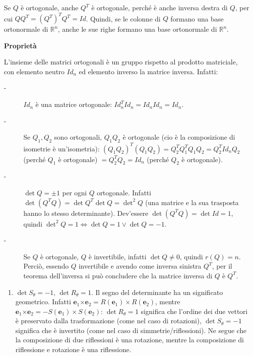 \documentclass{article}
\begin{document}
Se $Q$ \`{e} ortogonale, anche $Q^{T}$ \`{e} ortogonale, perch\'{e} \`{e}
anche inversa destra di $Q$, per cui $QQ^{T}=\left( Q^{T}\right)
^{T}Q^{T}=Id $. Quindi, se le colonne di $Q$ formano una base ortonormale di 
$%
\mathbb{R}
^{n}$, anche le sue righe formano una base ortonormale di $%
\mathbb{R}
^{n}$.

\textbf{Propriet\`{a}}

L'insieme delle matrici ortogonali \`{e} un gruppo rispetto al prodotto
matriciale, con elemento neutro $Id_{n}$ ed elemento inverso la matrice
inversa. Infatti:

\begin{description}
\item[-] $Id_{n}$ \`{e} una matrice ortogonale: $%
Id_{n}^{T}Id_{n}=Id_{n}Id_{n}=Id_{n}$.

\item[-] Se $Q_{1},Q_{2}$ sono ortogonali, $Q_{1}Q_{2}$ \`{e} ortogonale (cio%
\`{e} la composizione di isometrie \`{e} un'isometria): $\left(
Q_{1}Q_{2}\right) ^{T}\left( Q_{1}Q_{2}\right)
=Q_{2}^{T}Q_{1}^{T}Q_{1}Q_{2}=Q_{2}^{T}Id_{n}Q_{2}$ (perch\'{e} $Q_{1}$ \`{e}
ortogonale) $=Q_{2}^{T}Q_{2}=Id_{n}$ (perch\'{e} $Q_{2}$ \`{e} ortogonale).

\item[-] $\det Q=\pm 1$ per ogni $Q$ ortogonale. Infatti $\det \left(
Q^{T}Q\right) =\det Q^{T}\det Q=\det^{2}Q$ (una matrice e la sua trasposta
hanno lo stesso determinante). Dev'essere $\det \left( Q^{T}Q\right) =\det
Id=1$, quindi $\det^{2}Q=1\Longleftrightarrow \det Q=1\vee \det Q=-1$.

\item[-] Se $Q$ \`{e} ortogonale, $Q$ \`{e} invertibile, infatti $\det Q\neq
0$, quindi $r\left( Q\right) =n$. Perci\`{o}, essendo $Q$ invertibile e
avendo come inversa sinistra $Q^{T}$, per il teorema dell'inversa si pu\`{o}
concludere che la matrice inversa di $Q$ \`{e} $Q^{T}$.
\end{description}

\begin{enumerate}
\item $\det S_{\theta }=-1$, $\det R_{\theta }=1$. Il segno del determinante
ha un significato geometrico. Infatti $\mathbf{e}_{1}\mathbf{\times e}%
_{2}=R\left( \mathbf{e}_{1}\right) \times R\left( \mathbf{e}_{2}\right) $,
mentre $\mathbf{e}_{1}\mathbf{\times e}_{2}=-S\left( \mathbf{e}_{1}\right)
\times S\left( \mathbf{e}_{2}\right) $: $\det R_{\theta }=1$ significa che
l'ordine dei due vettori \`{e} preservato dalla trasformazione (come nel
caso di rotazioni), $\det S_{\theta }=-1$ significa che \`{e} invertito
(come nel caso di simmetrie/riflessioni). Ne segue che la composizione di
due riflessioni \`{e} una rotazione, mentre la composizione di riflessione e
rotazione \`{e} una riflessione.
\end{enumerate}
\end{document}
